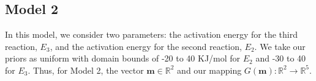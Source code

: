 \subsection{Model 2}


 In this model, we consider two parameters: the activation energy for
 the third reaction, $E_3$,
 and the activation energy for the second reaction, $E_2$. We take our priors
 as uniform with domain bounds of -20 to 40 KJ/mol for $E_2$ and -30 to 40 for $E_3$. Thus, for Model 2, the vector
 $\mathbf{m} \in \mathbb{R}^2$ and our mapping $G(\mathbf{m}):
 \mathbb{R}^2 \rightarrow \mathbb{R}^5$.













